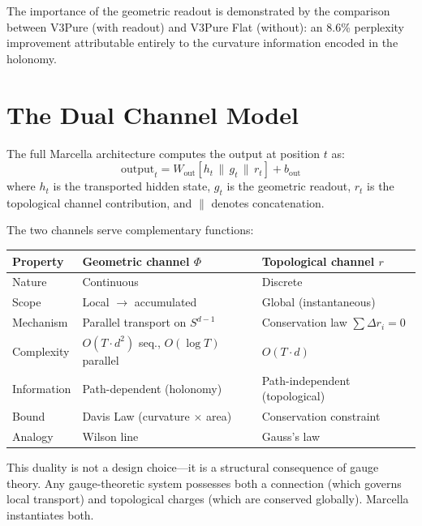 \documentclass[11pt,a4paper]{article}
\theoremstyle{definition}
\theoremstyle{remark}
\begin{document}
The importance of the geometric readout is demonstrated by the 
comparison between V3Pure (with readout) and V3Pure Flat (without): 
an 8.6\% perplexity improvement attributable entirely to the 
curvature information encoded in the holonomy.


\section{The Dual Channel Model}
\label{sec:dual-channel}

The full Marcella architecture computes the output at position $t$ as:
\begin{equation}
    \mathrm{output}_t = W_{\mathrm{out}} \left[ h_t \,\|\, g_t \,\|\, r_t \right] + b_{\mathrm{out}}
\label{eq:full-output}
\end{equation}
where $h_t$ is the transported hidden state, $g_t$ is the geometric 
readout, $r_t$ is the topological channel contribution, and $\|$ 
denotes concatenation.

The two channels serve complementary functions:

\begin{center}
\begin{tabular}{lll}
\toprule
\textbf{Property} & \textbf{Geometric channel $\Phi$} & \textbf{Topological channel $r$} \\
\midrule
Nature & Continuous & Discrete \\
Scope & Local $\to$ accumulated & Global (instantaneous) \\
Mechanism & Parallel transport on $S^{d-1}$ & Conservation law $\sum \Delta r_i = 0$ \\
Complexity & $O(T \cdot d^2)$ seq., $O(\log T)$ parallel & $O(T \cdot d)$ \\
Information & Path-dependent (holonomy) & Path-independent (topological) \\
Bound & Davis Law (curvature $\times$ area) & Conservation constraint \\
Analogy & Wilson line & Gauss's law \\
\bottomrule
\end{tabular}
\end{center}

\noindent This duality is not a design choice---it is a structural 
consequence of gauge theory. Any gauge-theoretic system possesses 
both a connection (which governs local transport) and topological 
charges (which are conserved globally). Marcella instantiates both.
\end{document}
